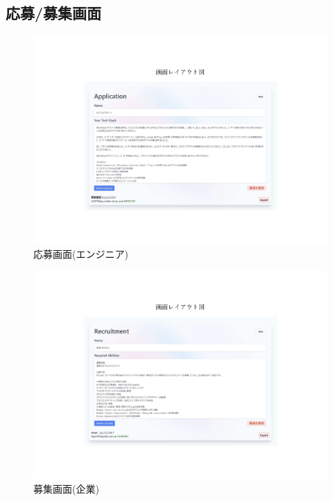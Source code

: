 \documentclass[10pt]{ltjsarticle}
\begin{document}
\newpage
\subsection{応募/募集画面}
\begin{figure}[H]
    \centering
    \includegraphics[trim=5.2cm 3.4cm 5.2cm 4.6cm, clip, width=14cm]{./img/Form_pages_engineer.pdf}
    \caption{応募画面(エンジニア)}
    \label{fig:form_engineer}
\end{figure}
\vspace{-.5cm}

\begin{figure}[H]
    \centering
    \includegraphics[trim=5.2cm 3.4cm 5.2cm 4.6cm, clip, width=14cm]{./img/Form_pages_company.pdf}
    \caption{募集画面(企業)}
    \label{fig:form_company}
\end{figure}
\vspace{-.5cm}
\end{document}
